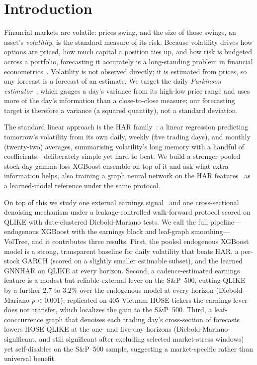 \documentclass[runningheads,a4paper]{llncs}
\begin{document}
\section{Introduction}
Financial markets are volatile: prices swing, and the size of those swings, an asset's
\emph{volatility}, is the standard measure of its risk. Because volatility drives how options are
priced, how much capital a position ties up, and how risk is budgeted across a portfolio, forecasting
it accurately is a long-standing problem in financial econometrics~\cite{corsi2009}. Volatility is
not observed directly; it is estimated from prices, so any forecast is a forecast of an estimate. We
target the daily \emph{Parkinson estimator}~\cite{parkinson1980}, which gauges a day's variance from
its high-low price range and uses more of the day's information than a close-to-close measure; our
forecasting target is therefore a variance (a squared quantity), not a standard deviation.

The standard linear approach is the HAR family~\cite{corsi2009}: a linear regression predicting
tomorrow's volatility from its own daily, weekly (five trading days), and monthly (twenty-two) averages,
summarising volatility's long memory with a handful of coefficients---deliberately simple yet hard to
beat. We build a stronger pooled stock-day gamma-loss XGBoost ensemble on top of it and ask what extra
information helps, also training a graph neural network on the HAR features~\cite{gnnhar2024} as a
learned-model reference under the same protocol.

On top of this we study one external earnings signal~\cite{patell1981} and one cross-sectional denoising
mechanism under a leakage-controlled walk-forward protocol scored on QLIKE with date-clustered
Diebold-Mariano tests. We call the full pipeline---endogenous XGBoost with the earnings block and
leaf-graph smoothing---VolTree, and it contributes three results. First, the pooled endogenous XGBoost
model is a strong, transparent baseline for daily volatility that beats HAR, a per-stock GARCH (scored on a
slightly smaller estimable subset), and the learned GNNHAR on QLIKE at every horizon. Second, a
cadence-estimated earnings feature is a modest but reliable external lever on the S\&P~500, cutting QLIKE by
a further 2.7 to 3.2\% over the endogenous model at every horizon (Diebold-Mariano $p<0.001$); replicated on
405 Vietnam HOSE tickers the earnings lever does not transfer, which localizes the gain to the S\&P~500.
Third, a leaf-cooccurrence graph that denoises each trading day's cross-section of forecasts lowers HOSE
QLIKE at the one- and five-day horizons (Diebold-Mariano-significant, and still significant after excluding
selected market-stress windows) yet self-disables on the S\&P~500 sample, suggesting a market-specific
rather than universal benefit.
\end{document}
